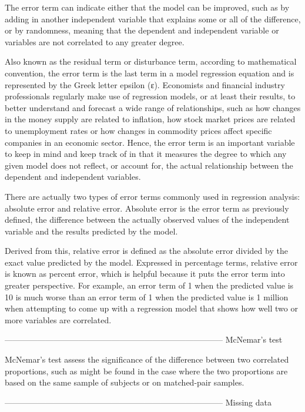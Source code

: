 The error term can indicate either that the model can be improved, such as by adding in another independent variable that explains some or all of the difference, or by randomness, meaning that the dependent and independent  variable or variables are not correlated to any greater degree.


Also known as the residual term or disturbance term, according to mathematical convention, the error term is the last term in a model regression equation and is represented by the Greek letter epsilon (ε). Economists and financial industry professionals regularly make use of regression models, or at least their results, to better understand and forecast a wide range of relationships, such as how changes in the money supply are related to inflation, how stock market prices are related to unemployment rates or how changes in commodity prices affect specific companies in an economic sector. Hence, the error term is an important variable to keep in mind and keep track of in that it measures the degree to which any given model does not reflect, or account for, the actual relationship between the dependent and independent variables.


There are actually two types of error terms commonly used in regression analysis: absolute error and relative error. Absolute error is the error term as previously defined, the difference between the actually observed values of the independent variable and the results predicted by the model. 


Derived from this, relative error is defined as the absolute error divided by the exact value predicted by the model. Expressed in percentage terms, relative error is known as percent error, which is helpful because it puts the error term into greater perspective. For example, an error term of 1 when the predicted value is 10 is much worse than an error term of 1 when the predicted value is 1 million when attempting to come up with a regression model that shows how well two or more variables are correlated.



--------------------------------------------------------------------------------
McNemar's test

McNemar's test assess the significance of the difference between two correlated proportions, such as might be found in the case where the two proportions are based on the same sample of subjects or on matched-pair samples.

 


--------------------------------------------------------------------------------
Missing data


